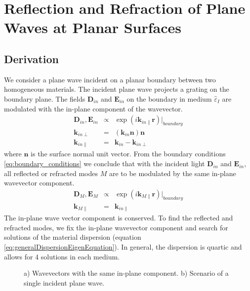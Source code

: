 \documentclass[12pt,a4paper,twoside,openright,BCOR10mm,headsepline,titlepage,abstracton,chapterprefix,final]{scrreprt}
\newcommand\Vector[1]{{\mathbf{#1}}}
\newcommand\Location{\Vector{r}}
\newcommand\wavenumber{k}
\newcommand\Wavevector{\Vector{\wavenumber}}
\newcommand\Tensor[1]{\hat{#1}}
\newcommand\scalarEfield{E}
\newcommand\scalarDfield{D}
\newcommand\Efield{\Vector{\scalarEfield}}
\newcommand\Dfield{\Vector{\scalarDfield}}
\newcommand\permittivity{\Tensor{\scalarpermittivity}}
\newcommand\scalarpermittivity{\varepsilon}
\newcommand\materialone{I}
\begin{document}
\section{Reflection and Refraction of Plane Waves at Planar Surfaces}

\subsection{Derivation}
We consider a plane wave incident on a planar boundary between two homogeneous materials.
The incident plane wave projects a grating on the boundary plane. 
The fields $\Dfield_{in}$ and $\Efield_{in}$ on the boundary in medium $\permittivity_\materialone$ are modulated with the in-plane component of the wavevector. 
\begin{eqnarray}
 \Dfield_{in}, \Efield_{in} &\propto& \exp( i \Wavevector_{in\parallel} \Location)|_{boundary} \\
 \Wavevector_{in\perp} &=& ( \Wavevector_{in} \Vector{n} ) \Vector{n} \\
 \Wavevector_{in\parallel} &=& \Wavevector_{in} - \Wavevector_{in\perp}
\end{eqnarray}
where $\Vector{n}$ is the surface normal unit vector.
From the boundary conditions \ref{eq:boundary_conditions} we conclude that with the incident light $\Dfield_{in}$ and $\Efield_{in}$, 
all reflected or refracted modes $M$ are to be modulated by the same in-plane wavevector component.
\begin{eqnarray}
  \Dfield_{M}, \Efield_{M} &\propto& \exp( i \Wavevector_{M\parallel} \Location)|_{boundary} \\
  \Wavevector_{M\parallel} &=& \Wavevector_{in\parallel}
\end{eqnarray}
The in-plane wave vector component is conserved.
To find the reflected and refracted modes, 
we fix the in-plane wavevector component and search for solutions of the material dispersion
(equation \ref{eq:generalDispersionEigenEquation}).
In general, the dispersion is quartic and allows for 4 solutions in each medium.
\begin{figure}
  \centering
  \caption{a) Wavevectors with the same in-plane component.
           b) Scenario of a single incident plane wave.}
  \label{fig:boundary_wavevectors}
\end{figure}
\end{document}
